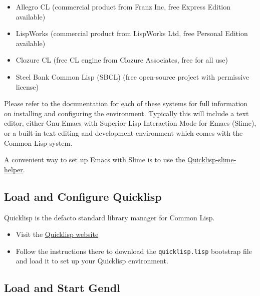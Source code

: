 \documentclass [11pt]{book}
\begin{document}
\begin{itemize}

\item Allegro CL (commercial product from Franz Inc, free Express Edition available)

\item LispWorks (commercial product from LispWorks Ltd, free Personal Edition available)

\item Clozure CL (free CL engine from Clozure Associates, free for all use)

\item Steel Bank Common Lisp (SBCL) (free open-source project with permissive license)

\end{itemize}

Please refer to the documentation for each of these systems
for full information on installing and configuring the
environment. Typically this will include a text editor, either Gnu
Emacs with Superior Lisp Interaction Mode for Emacs (Slime), or a
built-in text editing and development environment which comes with the
Common Lisp system.

A convenient way to set up Emacs with Slime is to use the \href{http://github.com/quicklisp/quicklisp-slime-helper}{Quicklisp-slime-helper}.

\subsection{Load and Configure Quicklisp}

\label{subsec:loadandconfigurequicklisp}

Quicklisp is the defacto standard library manager for Common
Lisp.

\begin{itemize}

\item Visit the \href{http://quicklisp.org}{Quicklisp website}

\item Follow the instructions there to download the \texttt{quicklisp.lisp} bootstrap file and load it to set up your Quicklisp environment.

\end{itemize}



\subsection{Load and Start Gendl}
\end{document}
